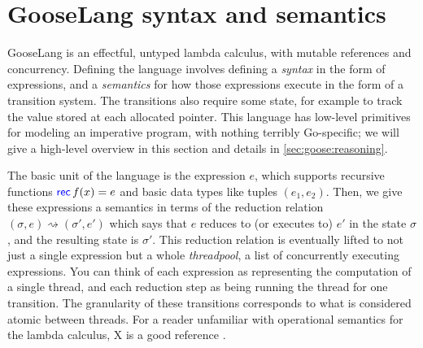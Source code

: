 \section{GooseLang syntax and semantics}%
\label{sec:goose:lang}

\newcommand{\goosedef}[1]{\mathsf{#1}}
\newcommand{\goosekw}[1]{\ensuremath{\goosedef{\textcolor{blue}{#1}}}}
\newcommand{\app}{\:}
\newcommand{\binop}{\circledcirc}
\newcommand{\unop}{\circleddash}

\newcommand{\external}{\mathsf{\textcolor{red}{\langle External \rangle}}}

\newcommand{\gooseif}[3]{\goosekw{if} \app #1 \app%
  \goosekw{then} \app #2 \app \goosekw{else} \app #3}

\newcommand{\recfx}{\goosekw{rec} \, f(x) = e}
\newcommand{\gooselambda}[1]{\goosekw{\lambda}#1.\,}

\newcommand{\reduces}{\rightsquigarrow}
\newcommand{\purereduction}{\overset{\mathrm{pure}}{\reduces}}

\newcommand{\seq}{;\,}
\newcommand{\defeq}{\triangleq}

GooseLang is an effectful, untyped lambda calculus, with mutable references and
concurrency. Defining the language involves defining a \emph{syntax} in the form
of expressions, and a \emph{semantics} for how those expressions execute in the
form of a transition system. The transitions also require some state, for
example to track the value stored at each allocated pointer. This language has
low-level primitives for modeling an imperative program, with nothing terribly
Go-specific; we will give a high-level overview in this section and details in
\autoref{sec:goose:reasoning}.

The basic unit of the language is the expression $e$, which supports recursive
functions $\recfx$ and basic data types like tuples $(e_1, e_2)$. Then, we give
these expressions a semantics in terms of the reduction relation
$(\sigma, e) \reduces (\sigma', e')$ which says that $e$ reduces to (or executes
to) $e'$ in the state $\sigma$, and the resulting state is $\sigma'$. This
reduction relation is eventually lifted to not just a single expression but a
whole \emph{threadpool}, a list of concurrently executing expressions. You
can think of each expression as representing the computation of a single thread,
and each reduction step as being running the thread for one transition. The
granularity of these transitions corresponds to what is considered atomic
between threads. For a reader unfamiliar with operational semantics for the
lambda calculus, X is a good reference .

